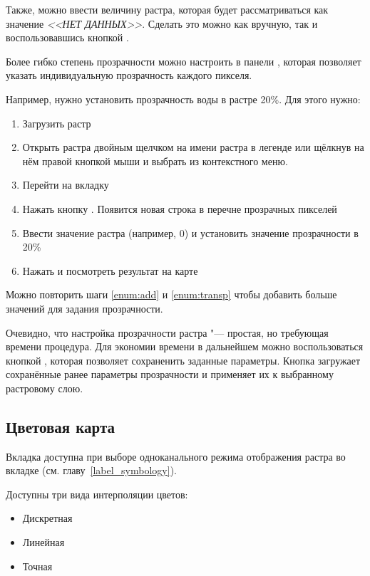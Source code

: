 Также, можно ввести величину растра, которая будет рассматриваться
как значение {\em <<НЕТ ДАННЫХ>>}. Сделать это можно как вручную, так и
воспользовавшись кнопкой
.

Более гибко степень прозрачности можно настроить в панели
, которая позволяет указать индивидуальную
прозрачность каждого пикселя.

Например, нужно установить прозрачность воды в растре
 20\%. Для этого нужно:
\begin{enumerate}
 \item Загрузить растр 
 \item Открыть  растра двойным щелчком на имени растра в легенде
 или щёлкнув на нём правой кнопкой мыши и выбрать 
 из контекстного меню.
 \item Перейти на вкладку 
 \item \label{enum:add} Нажать кнопку
 . Появится
 новая строка в перечне прозрачных пикселей
 \item \label{enum:transp} Ввести значение растра (например, 0) и
 установить значение прозрачности в 20\%
 \item Нажать  и посмотреть результат на карте
\end{enumerate}

Можно повторить шаги \ref{enum:add} и \ref{enum:transp} чтобы добавить
больше значений для задания прозрачности.

Очевидно, что настройка прозрачности растра "--- простая, но требующая времени
процедура. Для экономии времени в дальнейшем можно воспользоваться кнопкой
, которая позволяет сохраненить заданные
параметры. Кнопка 
загружает сохранённые ранее параметры прозрачности и применяет их к
выбранному растровому слою.

\subsection{Цветовая карта} \label{label_colormaptab}

Вкладка  доступна при выборе одноканального режима
отображения растра во вкладке  (см. главу~\ref{label_symbology}).

Доступны три вида интерполяции цветов:
\begin{itemize}[label=--]
\item Дискретная
\item Линейная
\item Точная
\end{itemize}

